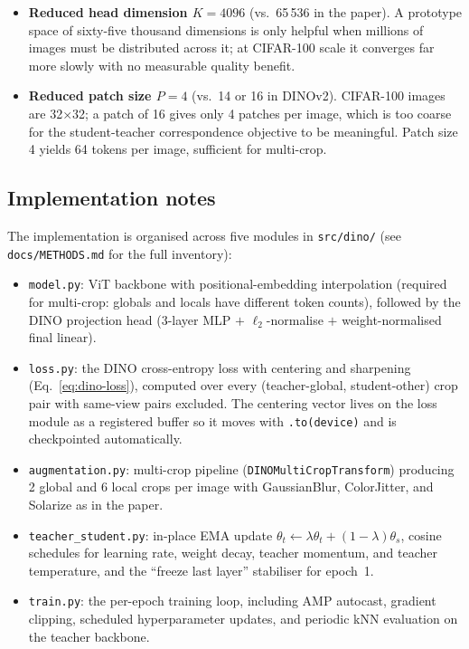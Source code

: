 \documentclass[11pt,a4paper]{article}
\begin{document}
\begin{itemize}[leftmargin=*]
  \item \textbf{Reduced head dimension $K=4096$} (vs.\ 65\,536 in the paper).
  A prototype space of sixty-five thousand dimensions is only helpful when
  millions of images must be distributed across it; at CIFAR-100 scale it
  converges far more slowly with no measurable quality benefit.
  \item \textbf{Reduced patch size $P=4$} (vs.\ 14 or 16 in DINOv2). CIFAR-100
  images are 32$\times$32; a patch of 16 gives only 4 patches per image,
  which is too coarse for the student-teacher correspondence objective to
  be meaningful. Patch size 4 yields 64 tokens per image, sufficient for
  multi-crop.
\end{itemize}

\subsection{Implementation notes}
\label{sec:mini-impl}

The implementation is organised across five modules in \texttt{src/dino/}
(see \texttt{docs/METHODS.md} for the full inventory):

\begin{itemize}[leftmargin=*]
  \item \texttt{model.py}: ViT backbone with positional-embedding
  interpolation (required for multi-crop: globals and locals have different
  token counts), followed by the DINO projection head (3-layer MLP $+$
  $\ell_2$-normalise $+$ weight-normalised final linear).
  \item \texttt{loss.py}: the DINO cross-entropy loss with centering and
  sharpening (Eq.~\ref{eq:dino-loss}), computed over every
  (teacher-global, student-other) crop pair with same-view pairs excluded.
  The centering vector lives on the loss module as a registered buffer
  so it moves with \texttt{.to(device)} and is checkpointed automatically.
  \item \texttt{augmentation.py}: multi-crop pipeline
  (\texttt{DINOMultiCropTransform}) producing 2 global and 6 local crops
  per image with GaussianBlur, ColorJitter, and Solarize as in the paper.
  \item \texttt{teacher\_student.py}: in-place EMA update
  $\theta_t \leftarrow \lambda \theta_t + (1-\lambda)\theta_s$, cosine
  schedules for learning rate, weight decay, teacher momentum, and teacher
  temperature, and the ``freeze last layer'' stabiliser for epoch~1.
  \item \texttt{train.py}: the per-epoch training loop, including AMP
  autocast, gradient clipping, scheduled hyperparameter updates, and
  periodic kNN evaluation on the teacher backbone.
\end{itemize}
\end{document}
